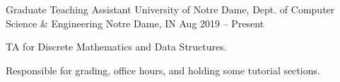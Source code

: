 



\begin{cventries}


    \cventry
    {Graduate Teaching Assistant} %
    {University of Notre Dame, Dept. of Computer Science \& Engineering} %
    {Notre Dame, IN} %
    {Aug 2019 -- Present} %
    {
        \begin{cvitems} %
        \item{TA for Discrete Mathematics and Data Structures.}
        \item{Responsible for grading, office hours, and holding some tutorial sections.}
        \end{cvitems}
    }






\end{cventries}
